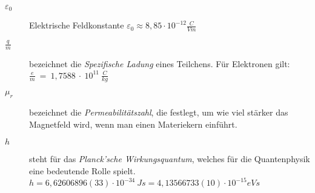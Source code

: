 \begin{description}
	\item[\(\varepsilon_0\)] Elektrische Feldkonstante \(\varepsilon_0 \approx 8,85 \cdot 10^{-12} \frac{C}{Vm}\)
	\item[\(\frac{q}{m}\)] bezeichnet die \textit{Spezifische Ladung} eines Teilchens. Für Elektronen gilt: \( \frac{e}{m}~=~1,7588~\cdot~10^{11}~\frac{C}{kg}\)
	\item[\(\mu_r\)] bezeichnet die \textit{Permeabilitätszahl}, die festlegt, um wie viel stärker das Magnetfeld wird, wenn man einen Materiekern einführt.
	\item[\(h\)] steht für das \textit{Planck'sche Wirkungsquantum}, welches für die Quantenphysik eine bedeutende Rolle spielt. \(h = 6,62606896(33) \cdot 10^{-34}\ Js = 4{,}13566733(10) \cdot 10^{-15} eVs\)
\end{description}

